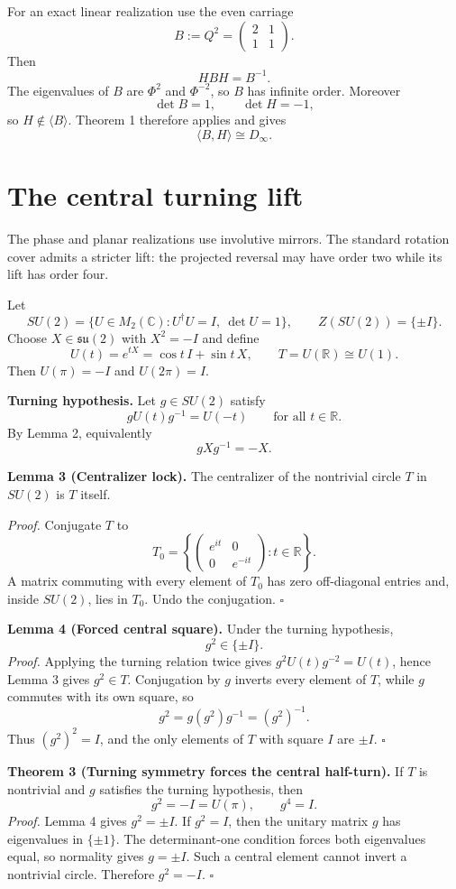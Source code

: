 \documentclass[11pt]{article}
\newcommand{\R}{\mathbb R}
\newcommand{\C}{\mathbb C}
\begin{document}
For an exact linear realization use the even carriage
\[
B:=Q^2=\begin{pmatrix}2&1\\1&1\end{pmatrix}.
\]
Then
\[
HBH=B^{-1}.
\]
The eigenvalues of $B$ are $\Phi^2$ and $\Phi^{-2}$, so $B$ has infinite order. Moreover
\[
\det B=1,\qquad \det H=-1,
\]
so $H\notin\langle B\rangle$. Theorem 1 therefore applies and gives
\[
\boxed{\langle B,H\rangle\cong D_{\infty}.}
\]

\section{The central turning lift}
The phase and planar realizations use involutive mirrors. The standard rotation cover admits a stricter lift: the projected reversal may have order two while its lift has order four.

Let
\[
SU(2)=\{U\in M_2(\C):U^\dagger U=I,\ \det U=1\},
\qquad Z(SU(2))=\{\pm I\}.
\]
Choose $X\in\mathfrak{su}(2)$ with $X^2=-I$ and define
\[
U(t)=e^{tX}=\cos t\,I+\sin t\,X,
\qquad T=U(\R)\cong U(1).
\]
Then $U(\pi)=-I$ and $U(2\pi)=I$.

\textbf{Turning hypothesis.}
Let $g\in SU(2)$ satisfy
\[
gU(t)g^{-1}=U(-t)\qquad\text{for all }t\in\R.
\]
By Lemma 2, equivalently
\[
gXg^{-1}=-X.
\]

\textbf{Lemma 3 (Centralizer lock).}
The centralizer of the nontrivial circle $T$ in $SU(2)$ is $T$ itself.

\textit{Proof.}
Conjugate $T$ to
\[
T_0=\left\{
\begin{pmatrix}e^{it}&0\\0&e^{-it}\end{pmatrix}:t\in\R
\right\}.
\]
A matrix commuting with every element of $T_0$ has zero off-diagonal entries and, inside $SU(2)$, lies in $T_0$. Undo the conjugation. \hfill$\square$

\textbf{Lemma 4 (Forced central square).}
Under the turning hypothesis,
\[
g^2\in\{\pm I\}.
\]
\textit{Proof.}
Applying the turning relation twice gives $g^2U(t)g^{-2}=U(t)$, hence Lemma 3 gives $g^2\in T$. Conjugation by $g$ inverts every element of $T$, while $g$ commutes with its own square, so
\[
g^2=g(g^2)g^{-1}=(g^2)^{-1}.
\]
Thus $(g^2)^2=I$, and the only elements of $T$ with square $I$ are $\pm I$. \hfill$\square$

\textbf{Theorem 3 (Turning symmetry forces the central half-turn).}
If $T$ is nontrivial and $g$ satisfies the turning hypothesis, then
\[
\boxed{g^2=-I=U(\pi),\qquad g^4=I.}
\]
\textit{Proof.}
Lemma 4 gives $g^2=\pm I$. If $g^2=I$, then the unitary matrix $g$ has eigenvalues in $\{\pm1\}$. The determinant-one condition forces both eigenvalues equal, so normality gives $g=\pm I$. Such a central element cannot invert a nontrivial circle. Therefore $g^2=-I$. \hfill$\square$
\end{document}
